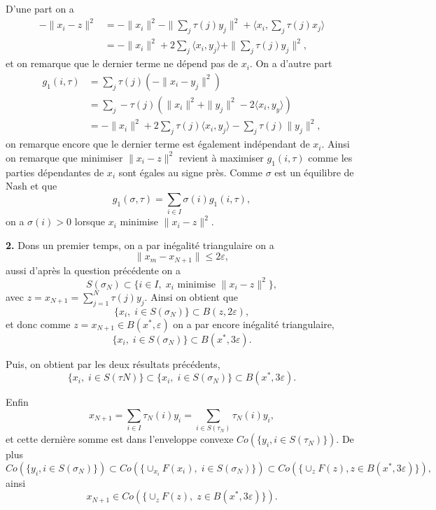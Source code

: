 \documentclass[12pt]{article}
\begin{document}
D'une part on a 
\begin{align*}
        -\|x_{i}-z\|^{2} &= -\|x_{i}\|^{2} - \|\sum_{j}\tau(j)y_{j}\|^{2} + \langle x_{i}, \sum_{j}\tau(j)x_{j} \rangle \\        
                         &= -\|x_{i}\|^{2} + 2\sum_{j}\langle x_{i}, y_{j} \rangle + \|\sum_{j}\tau(j)y_{j}\|^{2} 
,\end{align*}
et on remarque que le dernier terme ne dépend pas de $x_{i}$. On a d'autre part
\begin{align*}
        g_{1}(i, \tau) &= \sum_{j}\tau(j)(-\|x_{i}-y_{j}\|^{2}) \\
                       &= \sum_{j}-\tau(j)(\|x_{i}\|^{2}+\|y_{j}\|^{2}-2\langle x_{i}, y_{y}\rangle) \\
                       &= -\|x_{i}\|^{2} +  2\sum_{j}\tau(j)\langle x_{i}, y_{j} \rangle - \sum_{j}\tau(j)\|y_{j}\|^{2}
,\end{align*}
on remarque encore que le dernier terme est également indépendant de $x_{i}$. Ainsi on remarque que minimiser $\|x_{i}-z\|^{2}$ revient à maximiser $g_{1}(i, \tau)$ comme les parties dépendantes de $x_{i}$ sont égales au signe près.
Comme $\sigma$ est un équilibre de Nash et que \[
        g_{1}(\sigma, \tau) = \sum_{i \in I}\sigma(i)g_{1}(i, \tau)
,\] on a $\sigma(i) > 0$ lorsque $x_{i}$ minimise $\|x_{i}-z\|^{2}$.

\bigskip

\textbf{2.} Dons un premier temps, on a par inégalité triangulaire on a \[
\|x_{m} - x_{N+1}\| \le 2\varepsilon
,\]  
aussi d'après la question précédente on a \[
        S(\sigma_{N}) \subset \{i \in I, \; x_{i} \text{ minimise } \|x_{i}-z\|^{2}\} 
,\]
avec $z = x_{N+1} = \sum_{j=1}^{N} \tau(j)y_{j}$.
Ainsi on obtient que \[
        \{ x_{i}, \; i \in S(\sigma_{N})\} \subset B(z, 2\varepsilon)
,\] et donc comme $z = x_{N+1} \in B(x^{*}, \varepsilon)$ on a par encore inégalité triangulaire, \[
\{x_{i}, \; i \in S(\sigma_{N})\} \subset B(x^{*}, 3\varepsilon) 
.\] 


Puis, on obtient par les deux résultats précédents, \[
        \{x_{i}, \; i \in S(\tau{N})\} \subset \{x_{i}, \; i \in S(\sigma_{N})\} \subset B(x^{*}, 3\varepsilon)   
.\] 


Enfin \[
        x_{N+1} = \sum_{i \in I}\tau_{N}(i)y_{i} = \sum_{i \in S(\tau_{N})}\tau_{N}(i)y_{i}
        ,\]  et cette dernière somme est dans l'enveloppe convexe $Co(\{y_{i}, i \in S(\tau_{N})\})$. De plus \[
        Co(\{y_{i}, i \in S(\sigma_{N})\}) \subset Co(\{\cup_{x_{i}}F(x_{i}), \; i \in S(\sigma_{N})\}) \subset Co(\{\cup_{z}F(z), z \in B(x^{*}, 3\varepsilon)\}) 
,\]  ainsi \[
x_{N+1} \in Co(\{\cup_{z}F(z), \; z \in B(x^{*}, 3\varepsilon)\} )
.\]  
\end{document}
